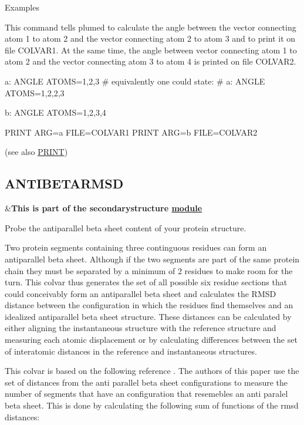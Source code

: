 \begin{DoxyParagraph}{Examples}

\end{DoxyParagraph}
This command tells plumed to calculate the angle between the vector connecting atom 1 to atom 2 and the vector connecting atom 2 to atom 3 and to print it on file C\+O\+L\+V\+A\+R1. At the same time, the angle between vector connecting atom 1 to atom 2 and the vector connecting atom 3 to atom 4 is printed on file C\+O\+L\+V\+A\+R2. \begin{DoxyVerb}a: ANGLE ATOMS=1,2,3 
# equivalently one could state:
# a: ANGLE ATOMS=1,2,2,3

b: ANGLE ATOMS=1,2,3,4

PRINT ARG=a FILE=COLVAR1
PRINT ARG=b FILE=COLVAR2
\end{DoxyVerb}
 (see also \hyperlink{PRINT}{P\+R\+I\+N\+T}) \hypertarget{ANTIBETARMSD}{}\subsection{A\+N\+T\+I\+B\+E\+T\+A\+R\+M\+S\+D}\label{ANTIBETARMSD}
\begin{TabularC}{2}
\hline
&{\bfseries  This is part of the secondarystructure \hyperlink{mymodules}{module }}   \\
\end{TabularC}
Probe the antiparallel beta sheet content of your protein structure.

Two protein segments containing three continguous residues can form an antiparallel beta sheet. Although if the two segments are part of the same protein chain they must be separated by a minimum of 2 residues to make room for the turn. This colvar thus generates the set of all possible six residue sections that could conceivably form an antiparallel beta sheet and calculates the R\+M\+S\+D distance between the configuration in which the residues find themselves and an idealized antiparallel beta sheet structure. These distances can be calculated by either aligning the instantaneous structure with the reference structure and measuring each atomic displacement or by calculating differences between the set of interatomic distances in the reference and instantaneous structures.

This colvar is based on the following reference \cite{pietrucci09jctc}. The authors of this paper use the set of distances from the anti parallel beta sheet configurations to measure the number of segments that have an configuration that resemebles an anti paralel beta sheet. This is done by calculating the following sum of functions of the rmsd distances\+:

